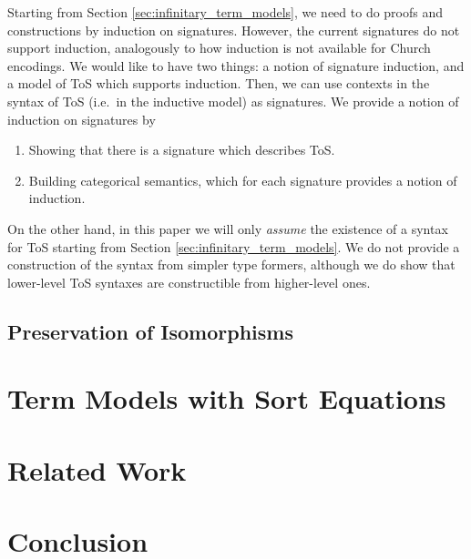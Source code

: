 \documentclass{llncs}
\begin{document}

Starting from Section \ref{sec:infinitary_term_models}, we need to do proofs and
constructions by induction on signatures. However, the current signatures do not
support induction, analogously to how induction is not available for Church
encodings. We would like to have two things: a notion of signature induction,
and a model of ToS which supports induction. Then, we can use contexts in the
syntax of ToS (i.e.\ in the inductive model) as signatures. We provide a notion
of induction on signatures by
\begin{enumerate}
  \item Showing that there is a signature which describes ToS.
  \item Building categorical semantics, which for each signature provides a notion of induction.
\end{enumerate}
On the other hand, in this paper we will only \emph{assume} the existence of a
syntax for ToS starting from Section \ref{sec:infinitary_term_models}. We do not provide a
construction of the syntax from simpler type formers, although we do show that
lower-level ToS syntaxes are constructible from higher-level ones.

\subsection{Preservation of Isomorphisms}

\section{Term Models with Sort Equations}
\label{sec:sort_term}

\section{Related Work}
\label{sec:related}

\section{Conclusion}
\label{sec:conclusion}



\end{document}
